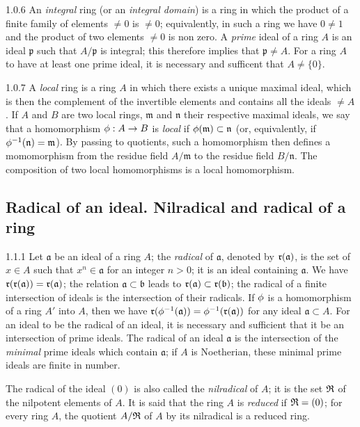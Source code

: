\begin{env}{1.0.6}
\label{env-0.1.0.6}
An \emph{integral} ring (or an \emph{integral domain}) is a ring in which the product of a
finite family of elements $\neq 0$ is $\neq 0$; equivalently, in such a ring we have
$0\neq 1$ and the product of two elements $\neq 0$ is non zero. A \emph{prime} ideal of a
ring $A$ is an ideal $\mathfrak{p}$ such that $A/\mathfrak{p}$ is integral; this therefore
implies that $\mathfrak{p}\neq A$. For a ring $A$ to have at least one prime ideal, it is
necessary and sufficent that $A\neq\{0\}$.
\end{env}

\begin{env}{1.0.7}
\label{env-0.1.0.7}
A \emph{local} ring is a ring $A$ in which there exists a unique maximal ideal, which is then
the complement of the invertible elements and contains all the ideals $\neq A$. If $A$ and $B$
are two local rings, $\mathfrak{m}$ and $\mathfrak{n}$ their respective maximal ideals, we
say that a homomorphism $\phi:A\to B$ is \emph{local} if
$\phi(\mathfrak{m})\subset\mathfrak{n}$ (or, equivalently, if
$\phi^{-1}(\mathfrak{n})=\mathfrak{m}$). By passing to quotients, such a homomorphism then
defines a momomorphism from the residue field $A/\mathfrak{m}$ to the residue field
$B/\mathfrak{n}$. The composition of two local homomorphisms is a local homomorphism.
\end{env}

\subsection{Radical of an ideal. Nilradical and radical of a ring}
\label{0-prelim-1.1}

\begin{env}{1.1.1}
\label{env-0.1.1.1}
Let $\mathfrak{a}$ be an ideal of a ring $A$; the \emph{radical} of $\mathfrak{a}$, denoted
by $\mathfrak{r}(\mathfrak{a})$, is the set of $x\in A$ such that $x^n\in\mathfrak{a}$ for
an integer $n>0$; it is an ideal containing $\mathfrak{a}$. We have
$\mathfrak{r}(\mathfrak{r}(\mathfrak{a}))=\mathfrak{r}(\mathfrak{a})$; the relation
$\mathfrak{a}\subset\mathfrak{b}$ leads to $\mathfrak{r}(\mathfrak{a})\subset\mathfrak{r}(\mathfrak{b})$;
the radical of a finite intersection of ideals is the intersection of their radicals. If
$\phi$ is a homomorphism of a ring $A'$ into $A$, then we have
$\mathfrak{r}(\phi^{-1}(\mathfrak{a}))=\phi^{-1}(\mathfrak{r}(\mathfrak{a}))$ for any ideal
$\mathfrak{a}\subset A$. For an ideal to be the radical of an ideal, it is necessary and
sufficient that it be an intersection of prime ideals. The radical of an ideal $\mathfrak{a}$
is the intersection of the \emph{minimal} prime ideals which contain $\mathfrak{a}$; if $A$
is Noetherian, these minimal prime ideals are finite in number.

The radical of the ideal $(0)$ is also called the \emph{nilradical} of $A$; it is the set
$\mathfrak{R}$ of the nilpotent elements of $A$. It is said that the ring $A$ is \emph{reduced} if
$\mathfrak{R}=(0)$; for every ring $A$, the quotient $A/\mathfrak{R}$ of $A$ by its nilradical is a
reduced ring.
\end{env}

